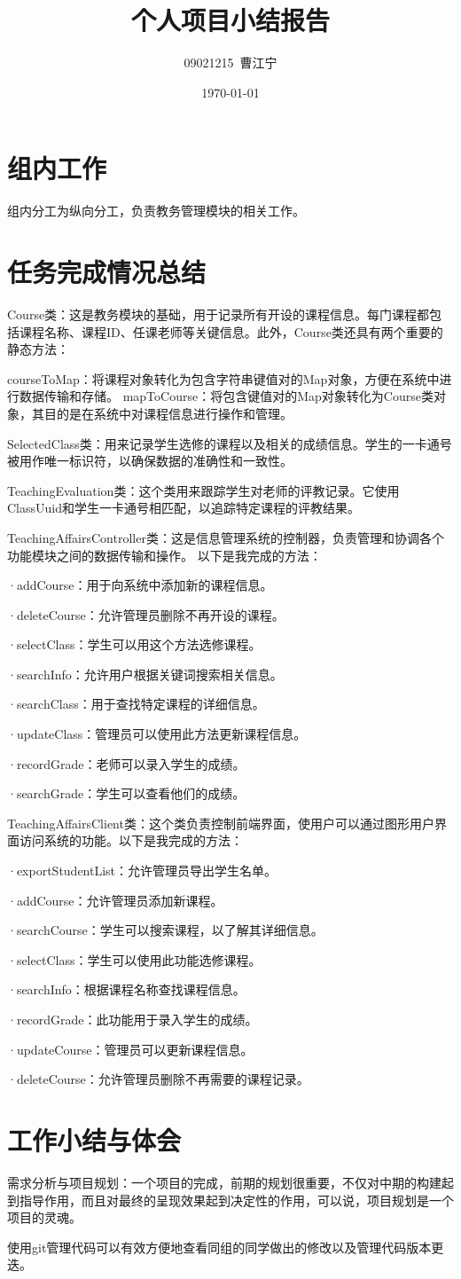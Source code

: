 \documentclass{article}
\title{个人项目小结报告}
\author{09021215~曹江宁}
\date{\today}
\begin{document}
\maketitle
\section{组内工作}
组内分工为纵向分工，负责教务管理模块的相关工作。
\section{任务完成情况总结}
Course类：这是教务模块的基础，用于记录所有开设的课程信息。每门课程都包括课程名称、课程ID、任课老师等关键信息。此外，Course类还具有两个重要的静态方法：

courseToMap：将课程对象转化为包含字符串键值对的Map对象，方便在系统中进行数据传输和存储。
mapToCourse：将包含键值对的Map对象转化为Course类对象，其目的是在系统中对课程信息进行操作和管理。

SelectedClass类：用来记录学生选修的课程以及相关的成绩信息。学生的一卡通号被用作唯一标识符，以确保数据的准确性和一致性。

TeachingEvaluation类：这个类用来跟踪学生对老师的评教记录。它使用ClassUuid和学生一卡通号相匹配，以追踪特定课程的评教结果。

TeachingAffairsController类：这是信息管理系统的控制器，负责管理和协调各个功能模块之间的数据传输和操作。
以下是我完成的方法：

·addCourse：用于向系统中添加新的课程信息。

·deleteCourse：允许管理员删除不再开设的课程。

·selectClass：学生可以用这个方法选修课程。

·searchInfo：允许用户根据关键词搜索相关信息。

·searchClass：用于查找特定课程的详细信息。

·updateClass：管理员可以使用此方法更新课程信息。

·recordGrade：老师可以录入学生的成绩。

·searchGrade：学生可以查看他们的成绩。

\par TeachingAffairsClient类：这个类负责控制前端界面，使用户可以通过图形用户界面访问系统的功能。以下是我完成的方法：

·exportStudentList：允许管理员导出学生名单。

·addCourse：允许管理员添加新课程。

·searchCourse：学生可以搜索课程，以了解其详细信息。

·selectClass：学生可以使用此功能选修课程。

·searchInfo：根据课程名称查找课程信息。

·recordGrade：此功能用于录入学生的成绩。

·updateCourse：管理员可以更新课程信息。

·deleteCourse：允许管理员删除不再需要的课程记录。

\section{工作小结与体会}
需求分析与项目规划：一个项目的完成，前期的规划很重要，不仅对中期的构建起到指导作用，而且对最终的呈现效果起到决定性的作用，可以说，项目规划是一个项目的灵魂。
\par 使用git管理代码可以有效方便地查看同组的同学做出的修改以及管理代码版本更迭。
\end{document}
